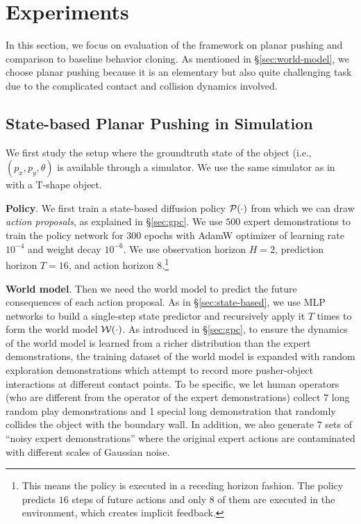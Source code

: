 
\section{Experiments}
\label{sec:experiments}

In this section, we focus on evaluation of the \nameshort framework on planar pushing and comparison to baseline behavior cloning. As mentioned in \S\ref{sec:world-model}, we choose planar pushing because it is an elementary but also quite challenging task due to the complicated contact and collision dynamics involved. 


\subsection{State-based Planar Pushing in Simulation}
\label{sec:push-T-sim-state}

We first study the setup where the groundtruth state of the object (i.e., $(p_x,p_y,\theta)$ is available through a simulator. We use the same simulator as in~\cite{chi2023diffusion} with a T-shape object.

\textbf{Policy}. We first train a state-based diffusion policy ${\cal P}(\cdot)$ \cite{chi2023diffusion} from which we can draw \emph{action proposals}, as explained in \S\ref{sec:gpc}. We use $500$ expert demonstrations to train the policy network for $300$ epochs with AdamW optimizer of learning rate $10^{-4}$ and weight decay $10^{-6}$. We use observation horizon $H=2$, prediction horizon $T= 16$, and action horizon $8$.\footnote{This means the policy is executed in a receding horizon fashion. The policy predicts $16$ steps of future actions and only $8$ of them are executed in the environment, which creates implicit feedback.} 


\textbf{World model}. Then we need the world model to predict the future consequences of each action proposal. As in \S\ref{sec:state-based}, we use MLP networks to build a single-step state predictor and recursively apply it $T$ times to form the world model ${\cal W}(\cdot)$. As introduced in \S\ref{sec:gpc}, to ensure the dynamics of the world model is learned from a richer distribution than the expert demonstrations, the training dataset of the world model is expanded with random exploration demonstrations which attempt to record more pusher-object interactions at different contact points. 
To be specific, we let human operators (who are different from the operator of the expert demonstrations) collect $7$ long random play demonstrations and 1 special long demonstration that randomly collides the object with the boundary wall. In addition, we also generate $7$ sets of ``noisy expert demonstrations'' where the original expert actions are contaminated with different scales of Gaussian noise.

